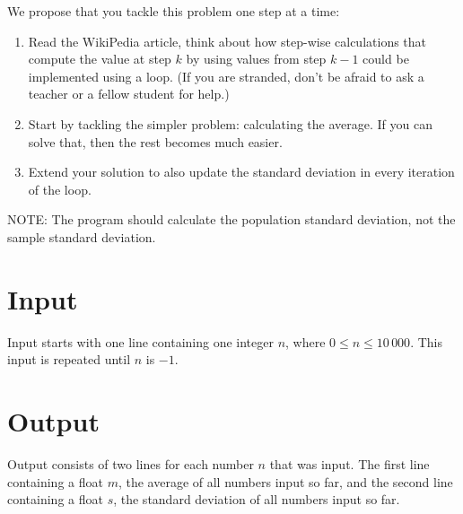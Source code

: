 We propose that you tackle this problem one step at a time:
\begin{enumerate}
    \item Read the WikiPedia article, think about how step-wise calculations 
    that compute the value at step $k$ by using values from step $k-1$
    could be implemented using a loop.
    (If you are stranded, don't be afraid to ask a teacher or a fellow student for help.)
    \item Start by tackling the simpler problem: calculating the average.
    If you can solve that, then the rest becomes much easier.
    \item Extend your solution to also update the standard deviation in every iteration of the loop.
\end{enumerate}

NOTE: The program should calculate the population standard deviation, not the sample standard deviation.

\section*{Input}

Input starts with one line containing one integer $n$, where $0 \leq n \leq 10\,000$.
This input is repeated until $n$ is $-1$.

\section*{Output}

Output consists of two lines for each number $n$ that was input.
The first line containing a float $m$, the average of all numbers input so far, and the second line containing a float $s$, the standard deviation of all numbers input so far.
